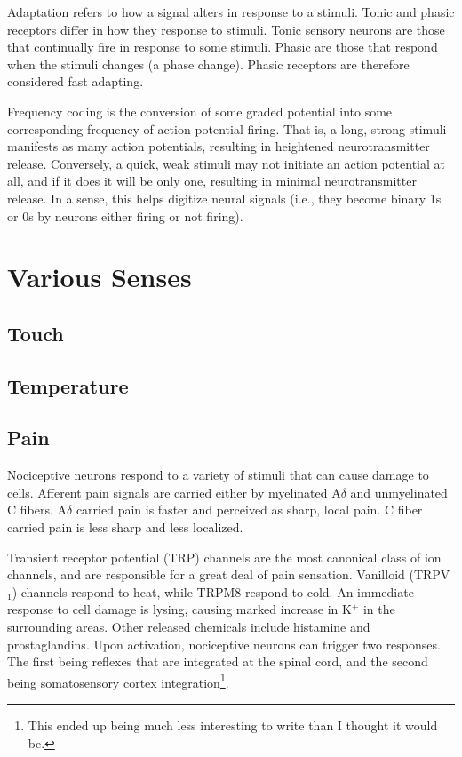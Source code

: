 \label{sec:FrequencyEncoding}

Adaptation refers to how a signal alters in response to a stimuli. Tonic and phasic receptors differ in how they response to stimuli. Tonic sensory neurons are those that continually fire in response to some stimuli. Phasic are those that respond when the stimuli changes (a phase change). Phasic receptors are therefore considered fast adapting.\newline

Frequency coding is the conversion of some graded potential into some corresponding frequency of action potential firing. That is, a long, strong stimuli manifests as many action potentials, resulting in heightened neurotransmitter release. Conversely, a quick, weak stimuli may not initiate an action potential at all, and if it does it will be only one, resulting in minimal neurotransmitter release. In a sense, this helps digitize neural signals (i.e., they become binary 1s or 0s by neurons either firing or not firing).

\section{Various Senses}

\subsection{Touch}

\subsection{Temperature}

\subsection{Pain}
Nociceptive neurons respond to a variety of stimuli that can cause damage to cells. Afferent pain signals are carried either by myelinated A$\delta$ and unmyelinated C fibers. A$\delta$ carried pain is faster and perceived as sharp, local pain. C fiber carried pain is less sharp and less localized.\newline

Transient receptor potential (TRP) channels are the most canonical class of ion channels, and are responsible for a great deal of pain sensation. Vanilloid (TRPV$_1$) channels respond to heat, while TRPM8 respond to cold. An immediate response to cell damage is lysing, causing marked increase in K$^+$ in the surrounding areas. Other released chemicals include histamine and prostaglandins. Upon activation, nociceptive neurons can trigger two responses. The first being reflexes that are integrated at the spinal cord, and the second being somatosensory cortex integration\footnote{This ended up being much less interesting to write than I thought it would be.}.\newline


